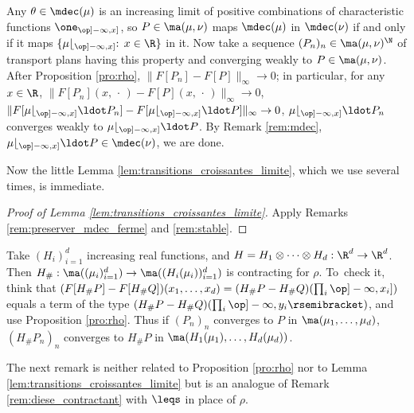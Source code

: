 
\begin{rem}\label{rem:preserver_mdec_ferme}
Any $\theta\in\mdec(\mu)$ is an increasing limit of positive combinations of characteristic functions $\one_{\op]-\infty,x]}$, so $P\in\ma(\mu,\nu)$ maps $\mdec(\mu)$ in $\mdec(\nu)$ if and only if it maps $\{\mu\lfloor_{\op]-\infty,x]}:\,x\in\R\}$ in it. Now take a sequence $(P_n)_n\in\ma(\mu,\nu)^\N$ of transport plans having this property and converging weakly to $P\in\ma(\mu,\nu)$. After Proposition \ref{pro:rho}, $\|F[P_n]-F[P]\|_\infty\to0$; in particular, for any $x\in\R$, $\|F[P_n](x,\,\cdot\,)-F[P](x,\,\cdot\,)\|_\infty\to0$, \ie $\|F[\mu\lfloor_{\op]-\infty,x]}{}\ldot P_n]-F[\mu\lfloor_{\op]-\infty,x]}{}\ldot P]\|_\infty\to0$, \ie $\mu\lfloor_{\op]-\infty,x]}{}\ldot P_n$ converges weakly to $\mu\lfloor_{\op]-\infty,x]}{}\ldot P$. By Remark \ref{rem:mdec}, $\mu\lfloor_{\op]-\infty,x]}{}\ldot P\in\mdec(\nu)$, we are done.
\end{rem}

Now the little Lemma \ref{lem:transitions_croissantes_limite}, which we use several times, is immediate.

\begin{proof}[Proof of Lemma \ref{lem:transitions_croissantes_limite}]\label{proof:lem:transitions_croissantes_limite} Apply Remarks \ref{rem:preserver_mdec_ferme} and \ref{rem:stable}.
\end{proof}

\begin{rem}\label{rem:diese_contractant} Take $(H_i)_{i=1}^d$ increasing real functions, and $H=H_1\otimes\cdots\otimes H_d:\R^d\to\R^d$. Then $H_\#:\ma((\mu_i)_{i=1}^d )\to\ma((H_i(\mu_i))_{i=1}^d)$ is contracting for $\rho$. To~check it, think that $(F[H_\#P]-F[H_\#Q])(x_1,\ldots,x_d)=(H_\#P\linebreak[2]-H_\#Q)(\prod_i\op]-\infty,x_i])$ equals a term of the type $(H_\#P-H_\#Q)(\prod_i\op]-\infty,y_i\rsemibracket)$, and use Proposition \ref{pro:rho}. Thus if $(P_n)_n$ converges to $P$ in $\ma(\mu_1,\ldots,\mu_d)$, $(H_\#P_n)_n$ converges to $H_\#P$ in $\ma(H_1(\mu_1),\ldots, H_d(\mu_d))$.
\end{rem}

The next remark is neither related to Proposition \ref{pro:rho} nor to Lemma \ref{lem:transitions_croissantes_limite} but is an analogue of Remark \ref{rem:diese_contractant} with $\leqs$ in place of $\rho$.

